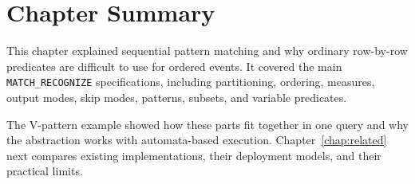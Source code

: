 \section{Chapter Summary}
\label{sec:bg-summary}
This chapter explained sequential pattern matching and why ordinary
row-by-row predicates are difficult to use for ordered events.  It
covered the main \texttt{MATCH\_RECOGNIZE} specifications, including
partitioning, ordering, measures, output modes, skip modes, patterns,
subsets, and variable predicates.

The V-pattern example showed how these parts fit together in one query
and why the abstraction works with automata-based execution.
Chapter~\ref{chap:related} next compares existing implementations,
their deployment models, and their practical limits.
